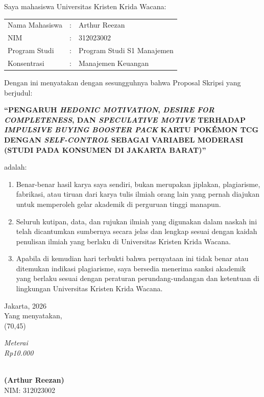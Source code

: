 \documentclass[12pt,a4paper]{article}
\numberwithin{equation}{section}
\numberwithin{table}{section}
\numberwithin{figure}{section}
\newcommand{\ukrida}{Universitas Kristen Krida Wacana}
\newcommand{\prodi}{Program Studi S1 Manajemen}
\newcommand{\konsentrasi}{Manajemen Keuangan}
\newcommand{\namamahasiswa}{Arthur Reezan}
\newcommand{\nim}{312023002}
\newcommand{\judulskripsi}{PENGARUH \emph{HEDONIC MOTIVATION}, \emph{DESIRE FOR COMPLETENESS}, DAN \emph{SPECULATIVE MOTIVE} TERHADAP \emph{IMPULSIVE BUYING} \emph{BOOSTER PACK} KARTU POK\'EMON TCG DENGAN \emph{SELF-CONTROL} SEBAGAI VARIABEL MODERASI (STUDI PADA KONSUMEN DI JAKARTA BARAT)}
\begin{document}
\vspace{0.3cm}
\noindent Saya mahasiswa \ukrida:

\vspace{0.15cm}
\noindent
\begin{tabular}{@{}lll@{}}
  Nama Mahasiswa & : & \namamahasiswa \\
  NIM            & : & \nim \\
  Program Studi  & : & \prodi \\
  Konsentrasi    & : & \konsentrasi \\
\end{tabular}

\vspace{0.3cm}
\noindent
Dengan ini menyatakan dengan sesungguhnya bahwa Proposal Skripsi yang berjudul:

\vspace{0.15cm}
\begin{center}
  \bfseries``\judulskripsi''
\end{center}

\vspace{0.15cm}
\noindent adalah:

\begin{enumerate}[topsep=2pt,itemsep=2pt,partopsep=0pt,parsep=0pt]
  \item Benar-benar hasil karya saya sendiri, bukan merupakan jiplakan, plagiarisme, fabrikasi, atau tiruan dari karya tulis ilmiah orang lain yang pernah diajukan untuk memperoleh gelar akademik di perguruan tinggi manapun.
  \item Seluruh kutipan, data, dan rujukan ilmiah yang digunakan dalam naskah ini telah dicantumkan sumbernya secara jelas dan lengkap sesuai dengan kaidah penulisan ilmiah yang berlaku di \ukrida.
  \item Apabila di kemudian hari terbukti bahwa pernyataan ini tidak benar atau ditemukan indikasi plagiarisme, saya bersedia menerima sanksi akademik yang berlaku sesuai dengan peraturan perundang-undangan dan ketentuan di lingkungan Universitas Kristen Krida Wacana.
\end{enumerate}

\vspace{0.5cm}
\noindent
\hfill
\begin{minipage}[t]{6.5cm}
  \centering
  Jakarta, \underline{\hspace{3.5cm}} 2026\\[0.25cm]
  Yang menyatakan,\\[0.35cm]
  \framebox(70,45){\begin{minipage}{2.2cm}\centering\scriptsize\itshape Meterai\\Rp10.000\end{minipage}}\\[0.45cm]
  \textbf{(\namamahasiswa)}\\
  NIM: \nim
\end{minipage}
\end{document}

